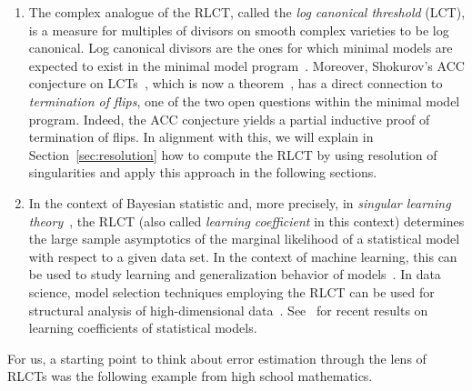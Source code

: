 \documentclass[11pt]{amsart}
\numberwithin{equation}{section}
\theoremstyle{plain}
\theoremstyle{definition}
\begin{document}
\begin{enumerate}
	\item The complex analogue of the RLCT, called the \emph{log canonical threshold} (LCT), is a measure for multiples of divisors on smooth complex varieties to be log canonical. Log canonical divisors are the ones for which minimal models are expected to exist in the minimal model program~\cite[Chapter 2]{Kollar_Mori_1998}. Moreover, Shokurov's ACC conjecture on LCTs~\cite{Shokurov1992}, which is now a theorem~\cite{ACCsolved2014}, has a direct connection to \emph{termination of flips}, one of the two open questions within the minimal model program. Indeed, the ACC conjecture yields a partial inductive proof of termination of flips. In alignment with this, we will explain in Section~\ref{sec:resolution} how to compute the RLCT by using resolution of singularities and apply this approach in the following sections.
	\item In the context of Bayesian statistic and, more precisely, in \emph{singular learning theory}~\cite{watanabe:book, Watanabe2018BayesianStatistics}, the RLCT (also called \emph{learning coefficient} in this context) determines the large sample asymptotics of the marginal likelihood of a statistical model with respect to a given data set. In the context of machine learning, this can be used to study learning and generalization behavior of models~\cite{DeepLearningIsSingular,JiayiGrokking}. In data science, model selection techniques employing the RLCT can be used for structural analysis of high-dimensional data~\cite{sbic:2017}. See~\cite{aoyagi2025neuralnetworks, drton2026singularlearningtheoryfactor} for recent results on learning coefficients of statistical models.
\end{enumerate}

For us, a starting point to think about error estimation through the lens of RLCTs was the following example from high school mathematics.
\end{document}
